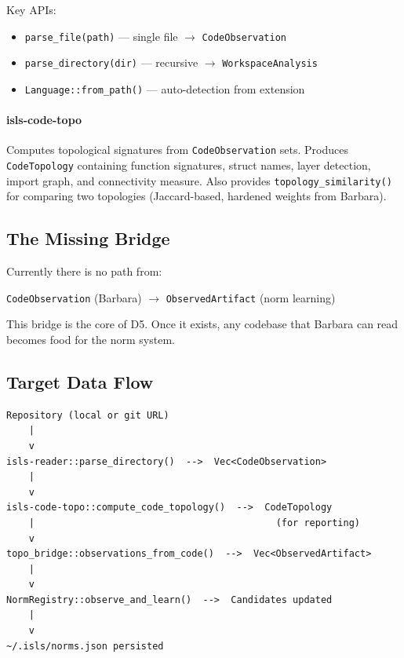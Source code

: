 \documentclass[11pt,a4paper]{article}
\begin{document}
Key APIs:
\begin{itemize}[nosep]
\item \texttt{parse\_file(path)} --- single file $\to$ \texttt{CodeObservation}
\item \texttt{parse\_directory(dir)} --- recursive $\to$ \texttt{WorkspaceAnalysis}
\item \texttt{Language::from\_path()} --- auto-detection from extension
\end{itemize}

\paragraph{isls-code-topo} Computes topological signatures from
\texttt{CodeObservation} sets. Produces \texttt{CodeTopology} containing
function signatures, struct names, layer detection, import graph, and
connectivity measure. Also provides \texttt{topology\_similarity()} for
comparing two topologies (Jaccard-based, hardened weights from Barbara).

\subsection{The Missing Bridge}

Currently there is no path from:
\begin{center}
\texttt{CodeObservation} (Barbara) $\to$ \texttt{ObservedArtifact} (norm learning)
\end{center}

This bridge is the core of D5. Once it exists, any codebase that Barbara
can read becomes food for the norm system.

\subsection{Target Data Flow}

\begin{lstlisting}[style=bash]
Repository (local or git URL)
    |
    v
isls-reader::parse_directory()  -->  Vec<CodeObservation>
    |
    v
isls-code-topo::compute_code_topology()  -->  CodeTopology
    |                                           (for reporting)
    v
topo_bridge::observations_from_code()  -->  Vec<ObservedArtifact>
    |
    v
NormRegistry::observe_and_learn()  -->  Candidates updated
    |
    v
~/.isls/norms.json persisted
\end{lstlisting}


\end{document}

